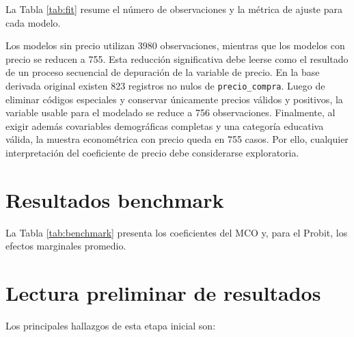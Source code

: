 \documentclass[12pt, a4paper]{article}
\begin{document}
La Tabla \ref{tab:fit} resume el número de observaciones y la métrica de ajuste para cada modelo.

\begin{table}[h!]
\centering
\caption{Resumen de muestra y ajuste}
\label{tab:fit}

\end{table}

Los modelos sin precio utilizan 3980 observaciones, mientras que los modelos con precio se reducen a 755. Esta reducción significativa debe leerse como el resultado de un proceso secuencial de depuración de la variable de precio. En la base derivada original existen 823 registros no nulos de \texttt{precio\_compra}. Luego de eliminar códigos especiales y conservar únicamente precios válidos y positivos, la variable usable para el modelado se reduce a 756 observaciones. Finalmente, al exigir además covariables demográficas completas y una categoría educativa válida, la muestra econométrica con precio queda en 755 casos. Por ello, cualquier interpretación del coeficiente de precio debe considerarse exploratoria.

\section{Resultados benchmark}

La Tabla \ref{tab:benchmark} presenta los coeficientes del MCO y, para el Probit, los efectos marginales promedio.

\begin{table}[h!]
\centering
\caption{Resultados comparados de benchmark}
\label{tab:benchmark}

\end{table}

\section{Lectura preliminar de resultados}

Los principales hallazgos de esta etapa inicial son:
\end{document}
